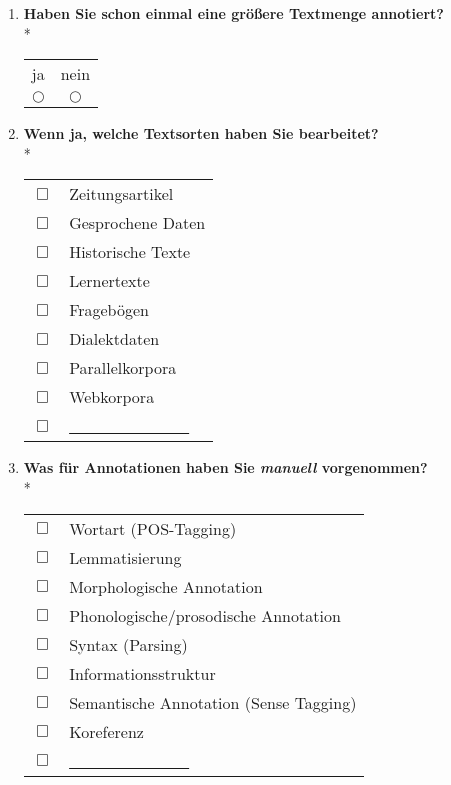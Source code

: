 \begin{enumerate}
	\item{
		\textbf{Haben Sie schon einmal eine größere Textmenge annotiert?}\\*
		\begin{center}
			\begin{tabular}{c | c}
					ja & nein \\
					$\bigcirc$ & $\bigcirc$ 
			\end{tabular}
		\end{center}
	}
	
	\item{
		\textbf{Wenn ja, welche Textsorten haben Sie bearbeitet?}\\*

			\begin{tabular}{c l}
				$\Box$ & Zeitungsartikel \\
				$\Box$ & Gesprochene Daten \\
				$\Box$ & Historische Texte \\
				$\Box$ & Lernertexte \\
				$\Box$ & Fragebögen \\
				$\Box$ & Dialektdaten \\
				$\Box$ & Parallelkorpora \\
				$\Box$ & Webkorpora \\
				$\Box$ & \underline{\ \ \ \ \ \ \ \ \ \ \ \ \ \ \ }
			\end{tabular}

	}
	
	\item{
		\textbf{Was für Annotationen haben Sie \emph{manuell} vorgenommen?}\\*

			\begin{tabular}{c l}
				$\Box$ & Wortart (POS-Tagging) \\
				$\Box$ & Lemmatisierung \\
				$\Box$ & Morphologische Annotation \\
				$\Box$ & Phonologische/prosodische Annotation \\
				$\Box$ & Syntax (Parsing) \\
				$\Box$ & Informationsstruktur \\
				$\Box$ & Semantische Annotation (Sense Tagging) \\
				$\Box$ & Koreferenz \\
				$\Box$ & \underline{\ \ \ \ \ \ \ \ \ \ \ \ \ \ \ }
			\end{tabular}
	}
	

\end{enumerate}
